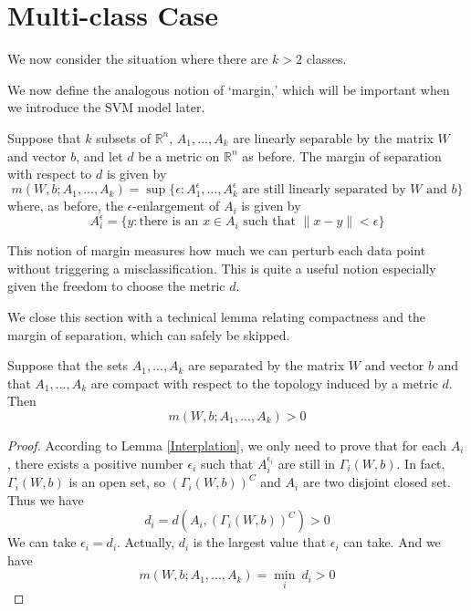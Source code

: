 \section{Multi-class Case}
We now consider the situation where there are $k > 2$ classes. 

We now define the analogous notion of `margin,' which will be important when we introduce the SVM model later.
\begin{definition}\label{margin_k_classes}
 Suppose that $k$ subsets of $\mathbb{R}^n$, $A_1,...,A_k$ are linearly separable by the matrix $W$ and vector $b$,
 and let $d$ be a metric on $\mathbb{R}^n$ as before. The margin of separation with respect to
 $d$ is given by
 \begin{equation}
  m(W,b; A_1,..., A_k) = \sup \{\epsilon:\text{$A^{\epsilon}_1,..., A^\epsilon_k$ are still linearly separated by $W$ and $b$}\}
 \end{equation}
where, as before, the $\epsilon$-enlargement of $A_i$ is given by
\begin{equation}
 A^\epsilon_i = \{y:\text{there is an $x\in A_i$ such that $\|x-y\| < \epsilon$}\}
\end{equation}
\end{definition}
This notion of margin measures how much we can perturb each data point without triggering a misclassification. This is 
quite a useful notion especially given the freedom to choose the metric $d$.

We close this section with a technical lemma relating compactness and the margin of separation, which can safely be skipped.
\begin{lemma}{\label{kclass_margin}}
 Suppose that the sets $A_1,...,A_k$ are separated by the matrix $W$ and vector $b$ and that $A_1,...,A_k$ are compact
 with respect to the topology induced by a metric $d$. Then
 \begin{equation}
  m(W,b; A_1,...,A_k) > 0
\end{equation}

\end{lemma}

\begin{proof}
	According to Lemma \ref{Interplation}, we only need to prove that for each $A_i$, there exists a positive number $\epsilon_i$ such that $A_i^{\epsilon_i}$ are still in $\Gamma_i(W,b)$. In fact, $\Gamma_i(W,b)$ is an open set, so $(\Gamma_i(W,b))^C$ and $A_i$ are two disjoint closed set. Thus we have
	\begin{equation}
	d_i = d(A_i,(\Gamma_i(W,b))^C) > 0
	\end{equation}
	We can take $\epsilon_i = d_i$. Actually, $d_i$ is the largest value that $\epsilon_i $ can take. And we have
	\begin{equation}
	m(W,b; A_1,...,A_k) =  \min_{i}~d_i > 0
	\end{equation}
\end{proof}


